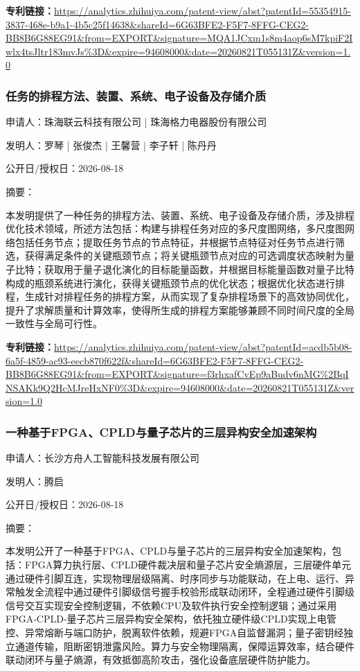 \documentclass[12pt,a4paper]{ctexart}
\begin{document}
\noindent\textbf{专利链接：}\url{https://analytics.zhihuiya.com/patent-view/abst?patentId=55354915-3837-468e-b9a1-4b5c25f14638&shareId=6G63BFE2-F5F7-8FFG-CEG2-BB8B6G88EG91&from=EXPORT&signature=MQA1JCxm1s8m4aop6sM7kpiF2Iwlx4tsJltr183mvJs%3D&expire=94608000&date=20260821T055131Z&version=1.0}

\subsubsection{ 任务的排程方法、装置、系统、电子设备及存储介质 }

申请人：珠海联云科技有限公司 | 珠海格力电器股份有限公司

发明人：罗琴 | 张俊杰 | 王馨营 | 李子轩 | 陈丹丹

公开日/授权日：2026-08-18

摘要：

本发明提供了一种任务的排程方法、装置、系统、电子设备及存储介质，涉及排程优化技术领域，所述方法包括：构建与排程任务对应的多尺度图网络，多尺度图网络包括任务节点；提取任务节点的节点特征，并根据节点特征对任务节点进行筛选，获得满足条件的关键瓶颈节点；将关键瓶颈节点对应的可选调度状态映射为量子比特；获取用于量子退化演化的目标能量函数，并根据目标能量函数对量子比特构成的瓶颈系统进行演化，获得关键瓶颈节点的优化状态；根据优化状态进行排程，生成针对排程任务的排程方案，从而实现了复杂排程场景下的高效协同优化，提升了求解质量和计算效率，使得所生成的排程方案能够兼顾不同时间尺度的全局一致性与全局可行性。

\noindent\textbf{专利链接：}\url{https://analytics.zhihuiya.com/patent-view/abst?patentId=acdb5b08-6a5f-4859-ac93-eecb870f622f&shareId=6G63BFE2-F5F7-8FFG-CEG2-BB8B6G88EG91&from=EXPORT&signature=f3rhxafCvEp9aBudv6nMG%2BqINSAKk9Q2HcMJreHxNF0%3D&expire=94608000&date=20260821T055131Z&version=1.0}

\subsubsection{ 一种基于FPGA、CPLD与量子芯片的三层异构安全加速架构 }

申请人：长沙方舟人工智能科技发展有限公司

发明人：腾启

公开日/授权日：2026-08-18

摘要：

本发明公开了一种基于FPGA、CPLD与量子芯片的三层异构安全加速架构，包括：FPGA算力执行层、CPLD硬件裁决层和量子芯片安全熵源层，三层硬件单元通过硬件引脚互连，实现物理层级隔离、时序同步与功能联动，在上电、运行、异常触发全流程中通过硬件引脚级信号握手校验形成联动闭环，全程通过硬件引脚级信号交互实现安全控制逻辑，不依赖CPU及软件执行安全控制逻辑；通过采用FPGA‑CPLD‑量子芯片三层异构安全架构，依托独立硬件级CPLD实现上电管控、异常熔断与端口防护，脱离软件依赖，规避FPGA自监督漏洞；量子密钥经独立通道传输，阻断密钥泄露风险。算力与安全物理隔离，保障运算效率，结合硬件联动闭环与量子熵源，有效抵御高阶攻击，强化设备底层硬件防护能力。
\end{document}
